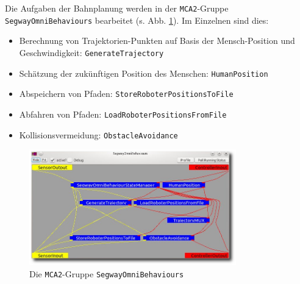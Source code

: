
Die Aufgaben der Bahnplanung werden in der \lstinline{MCA2}-Gruppe \lstinline{SegwayOmniBehaviours} bearbeitet (s. Abb. \ref{fig:behaviours}).
Im Einzelnen sind dies:
\begin{itemize}
	\item Berechnung von Trajektorien-Punkten auf Basis der Mensch-Position und Geschwindigkeit: \lstinline{GenerateTrajectory}
	\item Schätzung der zukünftigen Position des Menschen: \lstinline{HumanPosition}
	\item Abspeichern von Pfaden: \lstinline{StoreRoboterPositionsToFile}
	\item Abfahren von Pfaden: \lstinline{LoadRoboterPositionsFromFile}
	\item Kollisionsvermeidung: \lstinline{ObstacleAvoidance}
\end{itemize}

\begin{figure}[h]
	\center
	\includegraphics[width=0.8\textwidth]{graphics/behaviours}
	\caption{Die \lstinline{MCA2}-Gruppe \lstinline{SegwayOmniBehaviours}}
	\label{fig:behaviours}
\end{figure}

